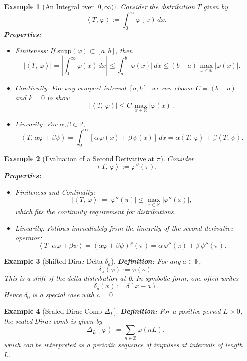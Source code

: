 \documentclass[11pt,openany]{book}
\newcommand{\dist}[2]{\left\langle #1,\, #2 \right\rangle}
\newtheorem{example}{Example}[section]
\begin{document}
\begin{example}[An Integral over \texorpdfstring{$[0,\infty)$}{[0,\infty)}]
\noindent
Consider the distribution $T$ given by
\[
\dist{T}{\varphi} := \int_{0}^{\infty} \varphi(x)\,dx.
\]
\textbf{Properties:}
\begin{itemize}
    \item[-] \emph{Finiteness:}
    If $\mathrm{supp}(\varphi) \subset [a,b]$, then
    \[
    \left|\dist{T}{\varphi}\right|
    = \left| \int_{0}^{\infty} \varphi(x)\,dx \right|
    \le \int_{a}^{b} |\varphi(x)|\,dx
    \le (b-a)\,\max_{x \in \mathbb{R}}|\varphi(x)|.
    \]
    \item[-] \emph{Continuity:}
    For any compact interval $[a,b]$, we can choose $C = (b-a)$ and $k = 0$ to show
    \[
    |\dist{T}{\varphi}| \le C \,\max_{x \in \mathbb{R}}|\varphi(x)|.
    \]
    \item[-] \emph{Linearity:}
    For $\alpha,\beta \in \mathbb{R}$,
    \[
    \dist{T}{\alpha \varphi + \beta \psi}
    = \int_{0}^{\infty} [\alpha\,\varphi(x) + \beta\,\psi(x)]\,dx
    = \alpha \dist{T}{\varphi} + \beta \dist{T}{\psi}.
    \]
\end{itemize}
\end{example}
\begin{example}[Evaluation of a Second Derivative at \texorpdfstring{$\pi$}{pi}]
\noindent
Consider
\[
\dist{T}{\varphi} := \varphi''(\pi).
\]
\textbf{Properties:}
\begin{itemize}
    \item[-] \emph{Finiteness and Continuity:}
    \[
    |\dist{T}{\varphi}| = |\varphi''(\pi)| \le \max_{x \in \mathbb{R}}|\varphi''(x)|,
    \]
    which fits the continuity requirement for distributions.
    \item[-] \emph{Linearity:}
    Follows immediately from the linearity of the second derivative operator:
    \[
    \dist{T}{\alpha \varphi + \beta \psi}
    = (\alpha \varphi + \beta \psi)''(\pi)
    = \alpha\,\varphi''(\pi) + \beta\,\psi''(\pi).
    \]
\end{itemize}
\end{example}
\begin{example}[Shifted Dirac Delta \texorpdfstring{$\delta_a$}{delta\_a}]
\noindent
\textbf{Definition:}
For any $a \in \mathbb{R}$,
\[
\delta_a(\varphi) := \varphi(a).
\]
This is a shift of the delta distribution at 0. In symbolic form, one often writes
\[
\delta_a(x) := \delta(x - a).
\]
Hence $\delta_0$ is a special case with $a=0$.
\end{example}
\begin{example}[Scaled Dirac Comb \texorpdfstring{$\Delta_L$}{Delta\_L}]
\noindent
\textbf{Definition:}
For a positive period $L>0$, the \emph{scaled Dirac comb} is given by
\[
\Delta_L(\varphi) := \sum_{n \in \mathbb{Z}} \varphi(nL),
\]
which can be interpreted as a periodic sequence of impulses at intervals of length $L$.
\end{example}
\bigskip
\end{document}
